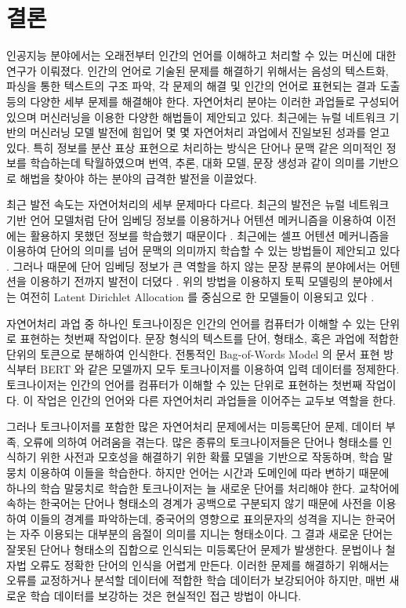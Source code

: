 \documentclass[oneside, ko,phd]{snuthesis_utf8_kor}
\begin{document}
\newpage
\chapter{결론} \label{conclusion}

인공지능 분야에서는 오래전부터 인간의 언어를 이해하고 처리할 수 있는 머신에 대한 연구가 이뤄졌다.
인간의 언어로 기술된 문제를 해결하기 위해서는 음성의 텍스트화, 파싱을 통한 텍스트의 구조 파악, 각 문제의 해결 및 인간의 언어로 표현되는 결과 도출 등의 다양한 세부 문제를 해결해야 한다.
자연어처리 분야는 이러한 과업들로 구성되어 있으며 머신러닝을 이용한 다양한 해법들이 제안되고 있다.
최근에는 뉴럴 네트워크 기반의 머신러닝 모델 발전에 힘입어 몇 몇 자연어처리 과업에서 진일보된 성과를 얻고 있다.
특히 정보를 분산 표상 표현으로 처리하는 방식은 단어나 문맥 같은 의미적인 정보를 학습하는데 탁월하였으며 번역, 추론, 대화 모델, 문장 생성과 같이 의미를 기반으로 해법을 찾아야 하는 분야의 급격한 발전을 이끌었다.

최근 발전 속도는 자연어처리의 세부 문제마다 다르다.
최근의 발전은 뉴럴 네트워크 기반 언어 모델처럼 단어 임베딩 정보를 이용하거나 어텐션 메커니즘을 이용하여 이전에는 활용하지 못했던 정보를 학습했기 때문이다 \cite{joulin2016bag, bahdanau2014neural, lin2017structured}.
최근에는 셀프 어텐션 메커니즘을 이용하여 단어의 의미를 넘어 문맥의 의미까지 학습할 수 있는 방법들이 제안되고 있다 \cite{vaswani2017attention, devlin2018bert}.
그러나 때문에 단어 임베딩 정보가 큰 역할을 하지 않는 문장 분류의 분야에서는 어텐션을 이용하기 전까지 발전이 더뎠다 \cite{yang2016hierarchical}.
위의 방법을 이용하지 토픽 모델링의 분야에서는 여전히 Latent Dirichlet Allocation \cite{blei2003latent} 를 중심으로 한 모델들이 이용되고 있다 \cite{allahyari2017brief}.

자연어처리 과업 중 하나인 토크나이징은 인간의 언어를 컴퓨터가 이해할 수 있는 단위로 표현하는 첫번째 작업이다.
문장 형식의 텍스트를 단어, 형태소, 혹은 과업에 적합한 단위의 토큰으로 분해하여 인식한다.
전통적인 Bag-of-Words Model 의 문서 표현 방식부터 BERT 와 같은 모델까지 모두 토크나이저를 이용하여 입력 데이터를 정제한다.
토크나이저는 인간의 언어를 컴퓨터가 이해할 수 있는 단위로 표현하는 첫번째 작업이다.
이 작업은 인간의 언어와 다른 자연어처리 과업들을 이어주는 교두보 역할을 한다.

그러나 토크나이저를 포함한 많은 자연어처리 문제에서는 미등록단어 문제, 데이터 부족, 오류에 의하여 어려움을 겪는다.
많은 종류의 토크나이저들은 단어나 형태소를 인식하기 위한 사전과 모호성을 해결하기 위한 확률 모델을 기반으로 작동하며, 학습 말뭉치 이용하여 이들을 학습한다.
하지만 언어는 시간과 도메인에 따라 변하기 때문에 하나의 학습 말뭉치로 학습한 토크나이저는 늘 새로운 단어를 처리해야 한다.
교착어에 속하는 한국어는 단어나 형태소의 경계가 공백으로 구분되지 않기 때문에 사전을 이용하여 이들의 경계를 파악하는데, 중국어의 영향으로 표의문자의 성격을 지니는 한국어는 자주 이용되는 대부분의 음절이 의미를 지니는 형태소이다.
그 결과 새로운 단어는 잘못된 단어나 형태소의 집합으로 인식되는 미등록단어 문제가 발생한다.
문법이나 철자법 오류도 정확한 단어의 인식을 어렵게 만든다.
이러한 문제를 해결하기 위해서는 오류를 교정하거나 분석할 데이터에 적합한 학습 데이터가 보강되어야 하지만, 매번 새로운 학습 데이터를 보강하는 것은 현실적인 접근 방법이 아니다.
\end{document}
